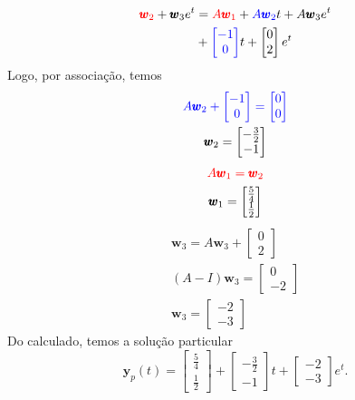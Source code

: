 \begin{ex}
\begin{align}
  {\color{red}\pmb{w}_2} + \pmb{w}_3e^t &= {\color{red}A\pmb{w}_1} + {\color{blue}A\pmb{w}_2}t + A\pmb{w}_3e^t \\
             &+ {\color{blue}\begin{bmatrix}
               -1\\
               0
             \end{bmatrix}}t +
  \begin{bmatrix}
    0 \\
    2
  \end{bmatrix}e^{t}
\end{align}
Logo, por associação, temos
\begin{gather}
  {\color{blue}A\pmb{w}_2 + \begin{bmatrix}
    -1 \\
    0
  \end{bmatrix}  =
  \begin{bmatrix}
    0\\
    0
  \end{bmatrix}}
\\
  \pmb{w}_2 =
  \begin{bmatrix}
    -\frac{3}{2} \\
    -1
  \end{bmatrix}
\end{gather}
\begin{gather}
  {\color{red}A\pmb{w}_1 = \pmb{w}_2}\\
  \pmb{w}_1 =
  \begin{bmatrix}
    \frac{5}{4} \\
    \frac{1}{2}
  \end{bmatrix}
\end{gather}
\begin{gather}
  \pmb{w}_3 = A\pmb{w}_3 +
  \begin{bmatrix}
    0 \\
    2
  \end{bmatrix}\\
  (A-I)\pmb{w}_3 =
  \begin{bmatrix}
    0 \\
    -2
  \end{bmatrix} \\
  \pmb{w}_3 =
  \begin{bmatrix}
    -2 \\
    -3
  \end{bmatrix}
\end{gather}
Do calculado, temos a solução particular
\begin{equation}
  \pmb{y}_p(t) =   \begin{bmatrix}
    \frac{5}{4} \\
    \frac{1}{2}
  \end{bmatrix} +   \begin{bmatrix}
    -\frac{3}{2} \\
    -1
  \end{bmatrix}t +   \begin{bmatrix}
    -2 \\
    -3
  \end{bmatrix}e^t.
\end{equation}


\end{ex}
